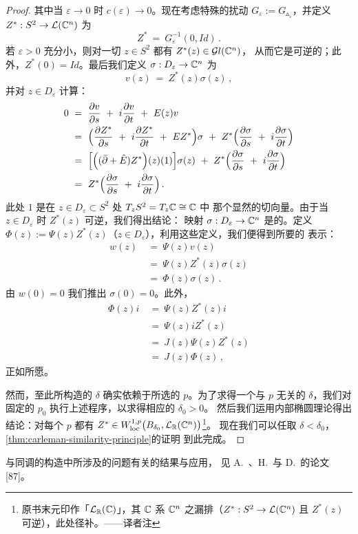 \begin{proof}
其中当 $\varepsilon\to0$ 时 $c(\varepsilon)\to0$。现在考虑特殊的扰动%
 $G_{\varepsilon}:=G_{\vartriangle_{\varepsilon}}$，并定义 $Z^{*}:S^{2}\to\mathcal{L}(\mathbb{C}^{n})$ 为
\begin{equation}\label{eq:a48-zstar}
Z^{*}\ =\ G_{\varepsilon}^{-1}(0,Id)\,.
\end{equation}
若 $\varepsilon>0$ 充分小，则对一切 $z\in S^{2}$ 都有 $Z^{*}(z)\in\mathcal{G}l(\mathbb{C}^{n})$，%
从而它是可逆的；此外，$Z^{*}(0)=Id$。最后我们定义 $\sigma:D_{\varepsilon}\to\mathbb{C}^{n}$ 为
\[
v(z)\ =\ Z^{*}(z)\sigma(z)\,,
\]
并对 $z\in D_{\varepsilon}$ 计算：
\begin{align*}
0\ &=\ \frac{\partial v}{\partial s}\ +\ i\frac{\partial v}{\partial t}\ +\ E(z)v\\
&=\ \Bigl(\frac{\partial Z^{*}}{\partial s}\ +\ i\frac{\partial Z^{*}}{\partial t}\ +\ EZ^{*}\Bigr)\sigma\ +\ Z^{*}\Bigl(\frac{\partial\sigma}{\partial s}\ +\ i\frac{\partial\sigma}{\partial t}\Bigr)\\
&=\ \Bigl[\Bigl((\bar{\partial}+\hat{E})Z^{*}\Bigr)(z)(1)\Bigr]\sigma(z)\ +\ Z^{*}\Bigl(\frac{\partial\sigma}{\partial s}\ +\ i\frac{\partial\sigma}{\partial t}\Bigr)\\
&=\ Z^{*}\Bigl(\frac{\partial\sigma}{\partial s}\ +\ i\frac{\partial\sigma}{\partial t}\Bigr)\,.
\end{align*}
此处 $1$ 是在 $z\in D_{\varepsilon}\subset S^{2}$ 处 $T_{z}S^{2}=T_{z}\mathbb{C}\cong\mathbb{C}$ 中%
那个显然的切向量。由于当 $z\in D_{\varepsilon}$ 时 $Z^{*}(z)$ 可逆，我们得出结论：%
映射 $\sigma:D_{\varepsilon}\to\mathbb{C}^{n}$ 是\trHolomorphic{}的。定义%
 $\Phi(z):=\Psi(z)Z^{*}(z)$（$z\in D_{\varepsilon}$），利用这些定义，我们便得到所要的%
表示：
\begin{align*}
w(z)\ &=\ \Psi(z)v(z)\\
&=\ \Psi(z)Z^{*}(z)\sigma(z)\\
&=\ \Phi(z)\sigma(z)\,.
\end{align*}
由 $w(0)=0$ 我们推出 $\sigma(0)=0$。此外，
\begin{align*}
\Phi(z)i\ &=\ \Psi(z)Z^{*}(z)i\\
&=\ \Psi(z)iZ^{*}(z)\\
&=\ J(z)\Psi(z)Z^{*}(z)\\
&=\ J(z)\Phi(z)\,,
\end{align*}
正如所愿。

然而，至此所构造的 $\delta$ 确实依赖于所选的 $p$。为了求得一个与 $p$ 无关的%
 $\delta$，我们对固定的 $p_{0}$ 执行上述程序，以求得相应的 $\delta_{0}>0$。%
然后我们运用内部椭圆\trRegularity{}理论得出结论：对每个 $p$ 都有%
 $Z^{*}\in W_{\mathrm{loc}}^{1,p}\bigl(B_{\delta_{0}},\mathcal{L}_{\mathbb{R}}(\mathbb{C}^{n})\bigr)$\footnote{原书末元印作「$\mathcal{L}_{\mathbb{R}}(\mathbb{C})$」，其 $\mathbb{C}$ 系 $\mathbb{C}^{n}$ 之漏排（$Z^{*}:S^{2}\to\mathcal{L}(\mathbb{C}^{n})$ 且 $Z^{*}(z)$ 可逆），此处径补。——译者注}。%
现在我们可以任取 $\delta<\delta_{0}$，\cref{thm:carleman-similarity-principle}的证明%
到此完成。
\end{proof}

与\trFloer{}同调的构造中所涉及的\trTransversality{}问题有关的结果与应用，%
见 A.~\trFloer、H.~\trHofer{}与 D.~\trSalamon{}的论文 [87]。
